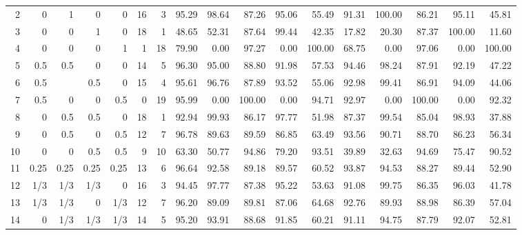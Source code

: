 \begin{landscape}
\begin{table}[p]
{\begin{tabular}{rrrrrrrrrrrrrrrrr}
2 & 0 & 1 & 0 & 0 & \multicolumn{1}{|r}{16} & 3 & \multicolumn{1}{|r}{95.29} & 98.64 & 87.26 & 95.06 & 55.49 & \multicolumn{1}{|r}{91.31} & 100.00 & 86.21 & 95.11 & 45.81 \\
3 & 0 & 0 & 1 & 0 & \multicolumn{1}{|r}{18} & 1 & \multicolumn{1}{|r}{48.65} & 52.31 & 87.64 & 99.44 & 42.35 & \multicolumn{1}{|r}{17.82} & 20.30 & 87.37 & 100.00 & 11.60 \\
4 & 0 & 0 & 0 & 1 & \multicolumn{1}{|r}{1} & 18 & \multicolumn{1}{|r}{79.90} & 0.00 & 97.27 & 0.00 & 100.00 & \multicolumn{1}{|r}{68.75} & 0.00 & 97.06 & 0.00 & 100.00 \\
5 & 0.5 & 0.5 & 0 & 0 & \multicolumn{1}{|r}{14} & 5 & \multicolumn{1}{|r}{96.30} & 95.00 & 88.80 & 91.98 & 57.53 & \multicolumn{1}{|r}{94.46} & 98.24 & 87.91 & 92.19 & 47.22 \\
6 & 0.5 &  & 0.5 & 0 & \multicolumn{1}{|r}{15} & 4 & \multicolumn{1}{|r}{95.61} & 96.76 & 87.89 & 93.52 & 55.06 & \multicolumn{1}{|r}{92.98} & 99.41 & 86.91 & 94.09 & 44.06 \\
7 & 0.5 & 0 & 0 & 0.5 & \multicolumn{1}{|r}{0} & 19 & \multicolumn{1}{|r}{95.99} & 0.00 & 100.00 & 0.00 & 94.71 & \multicolumn{1}{|r}{92.97} & 0.00 & 100.00 & 0.00 & 92.32 \\
8 & 0 & 0.5 & 0.5 & 0 & \multicolumn{1}{|r}{18} & 1 & \multicolumn{1}{|r}{92.94} & 99.93 & 86.17 & 97.77 & 51.98 & \multicolumn{1}{|r}{87.37} & 99.54 & 85.04 & 98.93 & 37.88 \\
9 & 0 & 0.5 & 0 & 0.5 & \multicolumn{1}{|r}{12} & 7 & \multicolumn{1}{|r}{96.78} & 89.63 & 89.59 & 86.85 & 63.49 & \multicolumn{1}{|r}{93.56} & 90.71 & 88.70 & 86.23 & 56.34 \\
10 & 0 & 0 & 0.5 & 0.5 & \multicolumn{1}{|r}{9} & 10 & \multicolumn{1}{|r}{63.30} & 50.77 & 94.86 & 79.20 & 93.51 & \multicolumn{1}{|r}{39.89} & 32.63 & 94.69 & 75.47 & 90.52 \\
11 & 0.25 & 0.25 & 0.25 & 0.25 & \multicolumn{1}{|r}{13} & 6 & \multicolumn{1}{|r}{96.64} & 92.58 & 89.18 & 89.57 & 60.52 & \multicolumn{1}{|r}{93.87} & 94.53 & 88.27 & 89.44 & 52.90 \\
12 & 1/3 & 1/3 & 1/3 & 0 & \multicolumn{1}{|r}{16} & 3 & \multicolumn{1}{|r}{94.45} & 97.77 & 87.38 & 95.22 & 53.63 & \multicolumn{1}{|r}{91.08} & 99.75 & 86.35 & 96.03 & 41.78 \\
13 & 1/3 & 1/3 & 0 & 1/3 & \multicolumn{1}{|r}{12} & 7 & \multicolumn{1}{|r}{96.20} & 89.09 & 89.81 & 87.06 & 64.68 & \multicolumn{1}{|r}{92.76} & 89.93 & 88.98 & 86.39 & 57.04 \\
14 & 0 & 1/3 & 1/3 & 1/3 & \multicolumn{1}{|r}{14} & 5 & \multicolumn{1}{|r}{95.20} & 93.91 & 88.68 & 91.85 & 60.21 & \multicolumn{1}{|r}{91.11} & 94.75 & 87.79 & 92.07 & 52.81
\end{tabular}
}
\end{table}
\end{landscape}

